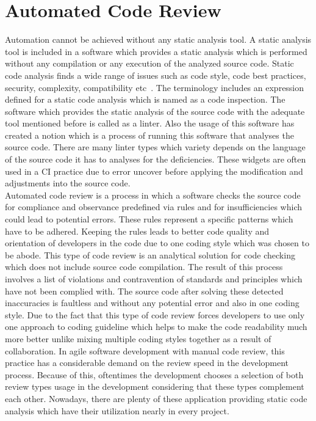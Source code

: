 \section{Automated Code Review}

Automation cannot be achieved without any static analysis tool. A static analysis tool is included in a software which provides a static analysis which is performed without any compilation or any execution of the analyzed source code. Static code analysis finds a wide range of issues such as code style, code best practices, security, complexity, compatibility etc~\cite{codacy}. The terminology includes an expression defined for a static code analysis which is named as a code inspection. The software which provides the static analysis of the source code with the adequate tool mentioned before is called as a linter. Also the usage of this software has created a notion  which is a process of running this software that analy\-ses the source code. There are many linter types which variety depends on the language of the source code it has to analyses for the deficiencies. These widgets are often used in a CI practice due to error uncover before applying the modification and adjustments into the source code.\\

Automated code review is a process in which a software checks the source code for compliance and observance predefined via rules and for insufficiencies which could lead to potential errors. These rules represent a specific patterns which have to be adhered. Keeping the rules leads to better code quality and orientation of developers in the code due to one coding style which was chosen to be abode. This type of code review is an analytical solution for code checking which does not include source code compilation. The result of this process involves a list of violations and contravention of standards and principles which have not been complied with. The source code after solving these detected inaccuracies is faultless and without any potential error and also in one coding style. Due to the fact that this type of code review forces developers to use only one approach to coding guideline which helps to make the code readability much more better unlike mixing multiple coding styles together as a result of collaboration. In agile software development with manual code review, this practice has a considerable demand on the review speed in the development process. Because of this, oftentimes the development chooses a selection of both review types usage in the development considering that these types complement each other. Nowadays, there are plenty of these application providing static code analysis which have their utilization nearly in every project.

